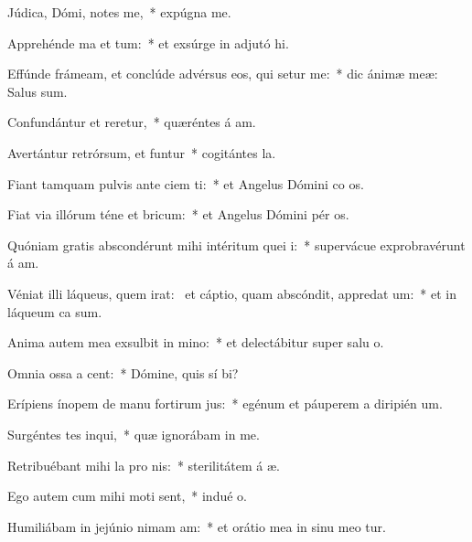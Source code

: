 \item Júdica, Dómi, notes me,~* expúgna  me.
\item Apprehénde ma et tum:~* et exsúrge in adjutó hi.
\item Effúnde frámeam, et conclúde advérsus eos, qui setur me:~* dic ánimæ meæ: Salus   sum.
\item Confundántur et reretur,~* quæréntes á am.
\item Avertántur retrórsum, et funtur~* cogitántes  la.
\item Fiant tamquam pulvis ante ciem ti:~* et Angelus Dómini co os.
\item Fiat via illórum téne et bricum:~* et Angelus Dómini pér os.
\item Quóniam gratis abscondérunt mihi intéritum quei i:~* supervácue exprobravérunt á am.
\item Véniat illi láqueus, quem irat:~\pscross{} et cáptio, quam abscóndit, appredat um:~* et in láqueum ca  sum.
\item Anima autem mea exsulbit in mino:~* et delectábitur super salu o.
\item Omnia ossa a cent:~* Dómine, quis sí bi?
\item Erípiens ínopem de manu fortirum jus:~* egénum et páuperem a diripién um.
\item Surgéntes tes inqui,~* quæ ignorábam in me.
\item Retribuébant mihi la pro nis:~* sterilitátem á æ.
\item Ego autem cum mihi moti sent,~* indué o.
\item Humiliábam in jejúnio nimam am:~* et orátio mea in sinu meo tur.
